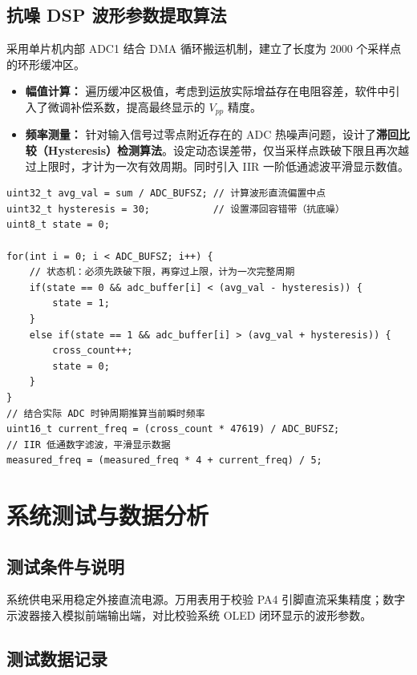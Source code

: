 \documentclass[a4paper,12pt]{ctexart}
\begin{document}
\subsection{抗噪 DSP 波形参数提取算法}
采用单片机内部 ADC1 结合 DMA 循环搬运机制，建立了长度为 2000 个采样点的环形缓冲区。
\begin{itemize}
    \item \textbf{幅值计算：} 遍历缓冲区极值，考虑到运放实际增益存在电阻容差，软件中引入了微调补偿系数，提高最终显示的 $V_{pp}$ 精度。
    \item \textbf{频率测量：} 针对输入信号过零点附近存在的 ADC 热噪声问题，设计了\textbf{滞回比较（Hysteresis）检测算法}。设定动态误差带，仅当采样点跌破下限且再次越过上限时，才计为一次有效周期。同时引入 IIR 一阶低通滤波平滑显示数值。
\end{itemize}

\begin{lstlisting}[caption={核心滞回过零检测与软件滤波代码段}]
uint32_t avg_val = sum / ADC_BUFSZ; // 计算波形直流偏置中点
uint32_t hysteresis = 30;           // 设置滞回容错带（抗底噪）
uint8_t state = 0;

for(int i = 0; i < ADC_BUFSZ; i++) {
    // 状态机：必须先跌破下限，再穿过上限，计为一次完整周期
    if(state == 0 && adc_buffer[i] < (avg_val - hysteresis)) {
        state = 1; 
    }
    else if(state == 1 && adc_buffer[i] > (avg_val + hysteresis)) {
        cross_count++; 
        state = 0;     
    }
}
// 结合实际 ADC 时钟周期推算当前瞬时频率
uint16_t current_freq = (cross_count * 47619) / ADC_BUFSZ; 
// IIR 低通数字滤波，平滑显示数据
measured_freq = (measured_freq * 4 + current_freq) / 5; 
\end{lstlisting}

\section{系统测试与数据分析}

\subsection{测试条件与说明}
系统供电采用稳定外接直流电源。万用表用于校验 PA4 引脚直流采集精度；数字示波器接入模拟前端输出端，对比校验系统 OLED 闭环显示的波形参数。

\subsection{测试数据记录}
\end{document}
